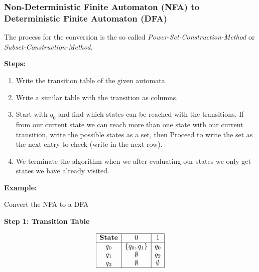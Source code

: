 \subsubsection{Non-Deterministic Finite Automaton (NFA) to Deterministic Finite Automaton (DFA)}

The process for the conversion is the so called \emph{Power-Set-Construction-Method} or 
\emph{Subset-Construction-Method}. 

\textbf{Steps:}

\begin{enumerate}

    \item Write the transition table of the given automata.

    \item Write a similar table with the transition as columns. 

    \item Start with \(q_0\) and find which states can be reached with the transitions. 
    If from our current state we can reach more than one state with our current transition, write the 
    possible states as a set, then Proceed to write the set as the next entry to check 
    (write in the next row). 

    \item We terminate the algorithm when we after evaluating our states we only get states we have already 
    visited.

\end{enumerate}

\textbf{Example:}

Convert the NFA to a DFA 

\begin{center}
\end{center}

\textbf{Step 1: Transition Table}

\[
    \begin{array}{|c|c|c|}
    \hline
    \textbf{State} & 0 & 1 \\
    \hline
    q_0 & \{q_0, q_1\} & q_0  \\
    q_1 & \emptyset & q_2\\
    q_2 & \emptyset & \emptyset \\
    \hline
    \end{array}
\]

